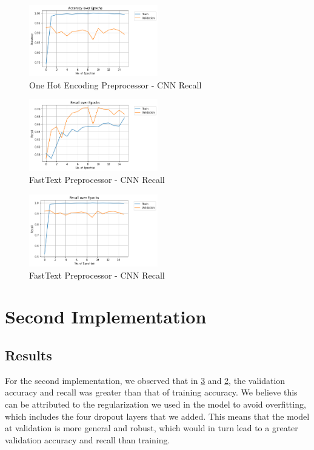 \documentclass[12pt]{report}
\begin{document}
\begin{figure}[h!]
	\centering
	\includegraphics[width=0.5\textwidth]{accuracy.png}
	\caption{One Hot Encoding Preprocessor - CNN Recall}
	\label{fig:ohep-rec}
\end{figure}


\begin{figure}[h!]
	\centering
	\includegraphics[width=0.5\textwidth]{recall-1.png}
	\caption{FastText Preprocessor - CNN Recall}
	\label{fig:ft-rec}
\end{figure}

\begin{figure}[h!]
	\centering
	\includegraphics[width=0.5\textwidth]{recall.png}
	\caption{FastText Preprocessor - CNN Recall}
	\label{fig:ft-acc}
\end{figure}


\section{Second Implementation}


\subsection{Results}

For the second implementation, we observed that in \ref{fig:ft-acc} and
\ref{fig:ft-rec}, the validation accuracy and
recall was greater than that of training accuracy. We believe this can be
attributed to the regularization we used in the model to avoid overfitting,
which includes the four dropout layers that we added. This means that the model
at validation is more general and robust, which would in turn lead to a greater
validation accuracy and recall than training.
\end{document}
